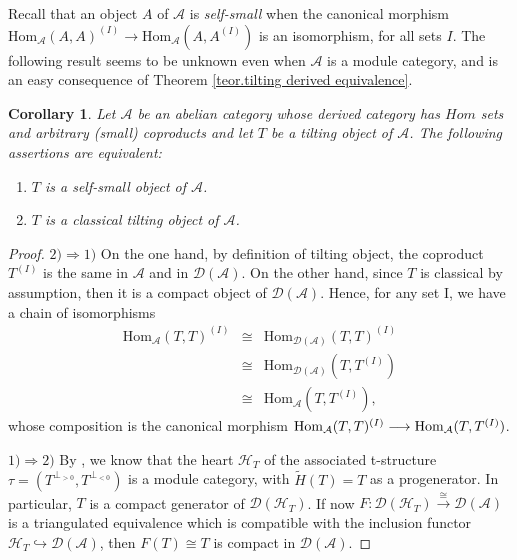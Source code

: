 \documentclass{proc-l}
\newcommand{\Hom}{{\rm Hom}}
\newtheorem{corollary}[theorem]{Corollary}
\theoremstyle{definition}
\theoremstyle{remark}
\numberwithin{equation}{section}
\begin{document}
Recall that an object $A$ of $\mathcal{A}$ is \emph{self-small} when the canonical morphism $\text{Hom}_\mathcal{A}(A,A)^{(I)}\longrightarrow\text{Hom}_\mathcal{A}(A,A^{(I)})$ is an isomorphism, for all sets $I$. The following result seems to be unknown even when $\mathcal{A}$ is a module category, and is an easy consequence of Theorem \ref{teor.tilting derived equivalence}.

\begin{corollary} \label{cor.self-small tilting object}
Let $\mathcal{A}$ be an abelian category whose derived category has $Hom$ sets and arbitrary (small) coproducts and let $T$ be a tilting object of $\mathcal{A}$. 
The following assertions are equivalent:

\begin{enumerate}
\item $T$ is a self-small object of $\mathcal{A}$.
\item $T$ is a classical tilting object of $\mathcal{A}$.
\end{enumerate} 
\end{corollary}
\begin{proof}
$2)\Longrightarrow 1)$ On the one hand, by definition of tilting object, the coproduct $T^{(I)}$ is the same in $\mathcal{A}$ and in $\mathcal{D}(\mathcal{A})$. On the other hand, since $T$ is classical by assumption, then it is a compact object of 
$\mathcal{D}(\mathcal{A})$. Hence, for any set I, we have a chain of isomorphisms 
\[\begin{array}{lcl}
\text{Hom}_\mathcal{A}(T,T)^{(I)} &\cong& \text{Hom}_{\mathcal{D}(\mathcal{A})}(T,T)^{(I)}  \\
     &\cong&\text{Hom}_{\mathcal{D}(\mathcal{A})}(T,T^{(I)})  \\
     &\cong& \text{Hom}_\mathcal{A}(T,T^{(I)}),
\end{array}\]
whose composition is the canonical morphism $\Hom_\mathcal{A}(T,T)^{(I)}\longrightarrow \Hom_\mathcal{A}(T,T^{(I)})$.

$1)\Longrightarrow 2)$ By \cite{NSZM}, we know that the heart $\mathcal{H}_T$ of the associated t-structure $\tau =(T^{\perp_{>0}},T^{\perp_{<0}})$ is a module category, with $\tilde{H}(T)=T$ as a progenerator. In particular, $T$ is a compact generator of $\mathcal{D}(\mathcal{H}_T)$.  If now $F:\mathcal{D}(\mathcal{H}_T)\stackrel{\cong}{\longrightarrow}\mathcal{D}(\mathcal{A})$ is a triangulated equivalence which is compatible with the inclusion functor $\mathcal{H}_T\hookrightarrow\mathcal{D}(\mathcal{A})$, then $F(T)\cong T$ is compact in $\mathcal{D}(\mathcal{A})$. 
\end{proof}
\end{document}
